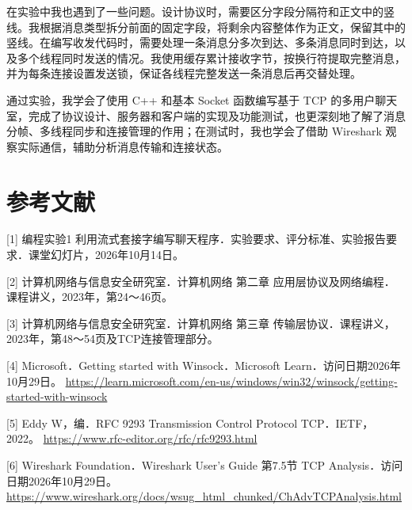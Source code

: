 \documentclass[UTF8,a4paper,10pt,fontset=fandol]{ctexart}
\begin{document}
在实验中我也遇到了一些问题。设计协议时，需要区分字段分隔符和正文中的竖线。我根据消息类型拆分前面的固定字段，将剩余内容整体作为正文，保留其中的竖线。在编写收发代码时，需要处理一条消息分多次到达、多条消息同时到达，以及多个线程同时发送的情况。我使用缓存累计接收字节，按换行符提取完整消息，并为每条连接设置发送锁，保证各线程完整发送一条消息后再交替处理。

通过实验，我学会了使用 C++ 和基本 Socket 函数编写基于 TCP 的多用户聊天室，完成了协议设计、服务器和客户端的实现及功能测试，也更深刻地了解了消息分帧、多线程同步和连接管理的作用；在测试时，我也学会了借助 Wireshark 观察实际通信，辅助分析消息传输和连接状态。

\section{参考文献}
[1] 编程实验1 利用流式套接字编写聊天程序．实验要求、评分标准、实验报告要求．课堂幻灯片，2026年10月14日。

[2] 计算机网络与信息安全研究室．计算机网络 第二章 应用层协议及网络编程．课程讲义，2023年，第24～46页。

[3] 计算机网络与信息安全研究室．计算机网络 第三章 传输层协议．课程讲义，2023年，第48～54页及TCP连接管理部分。

[4] Microsoft．Getting started with Winsock．Microsoft Learn．访问日期2026年10月29日。 \url{https://learn.microsoft.com/en-us/windows/win32/winsock/getting-started-with-winsock}

[5] Eddy W，编．RFC 9293 Transmission Control Protocol TCP．IETF，2022。 \url{https://www.rfc-editor.org/rfc/rfc9293.html}

[6] Wireshark Foundation．Wireshark User’s Guide 第7.5节 TCP Analysis．访问日期2026年10月29日。 \url{https://www.wireshark.org/docs/wsug_html_chunked/ChAdvTCPAnalysis.html}
\end{document}
